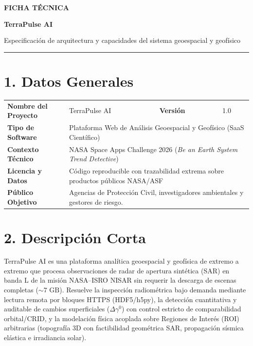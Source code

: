 \documentclass[11pt,a4paper]{article}
\begin{document}
\begin{center}
{\color{navy}\fontsize{16}{19}\selectfont\bfseries FICHA TÉCNICA}\par
\vspace{3pt}
{\fontsize{19}{23}\selectfont\bfseries TerraPulse AI}\par
\vspace{4pt}
{\small Especificación de arquitectura y capacidades del sistema geoespacial y geofísico}
\end{center}
\vspace{2pt}
{\color{navy}\rule{\textwidth}{1.1pt}}
\vspace{2pt}

\section*{1. Datos Generales}

\begin{tabularx}{\textwidth}{@{}l X l X@{}}

\toprule

\textbf{Nombre del Proyecto} & TerraPulse AI & \textbf{Versi\'on} & 1.0 \\

\textbf{Tipo de Software} & \multicolumn{3}{l}{Plataforma Web de An\'alisis Geoespacial y Geof\'isico (SaaS Cient\'ifico)} \\

\textbf{Contexto Técnico} & \multicolumn{3}{l}{NASA Space Apps Challenge 2026 (\emph{Be an Earth System Trend Detective})} \\

\textbf{Licencia y Datos} & \multicolumn{3}{l}{C\'odigo reproducible con trazabilidad extrema sobre productos p\'ublicos NASA/ASF} \\

\addlinespace[2pt]

\textbf{P\'ublico Objetivo} & \multicolumn{3}{l}{Agencias de Protecci\'on Civil, investigadores ambientales y gestores de riesgo.} \\

\bottomrule

\end{tabularx}

\section*{2. Descripci\'on Corta}

TerraPulse AI es una plataforma anal\'itica geoespacial y geof\'isica de extremo a extremo que procesa observaciones de radar de apertura sint\'etica (SAR) en banda L de la misi\'on NASA--ISRO NISAR sin requerir la descarga de escenas completas ($\sim 7\text{ GB}$). Resuelve la inspecci\'on radiom\'etrica bajo demanda mediante lectura remota por bloques HTTPS (HDF5/h5py), la detecci\'on cuantitativa y auditable de cambios superficiales ($\Delta\gamma^0$) con control estricto de comparabilidad orbital/CRID, y la modelaci\'on f\'isica acoplada sobre Regiones de Inter\'es (ROI) arbitrarias (topograf\'ia 3D con factibilidad geom\'etrica SAR, propagaci\'on s\'ismica el\'astica e irradiancia solar).
\end{document}
